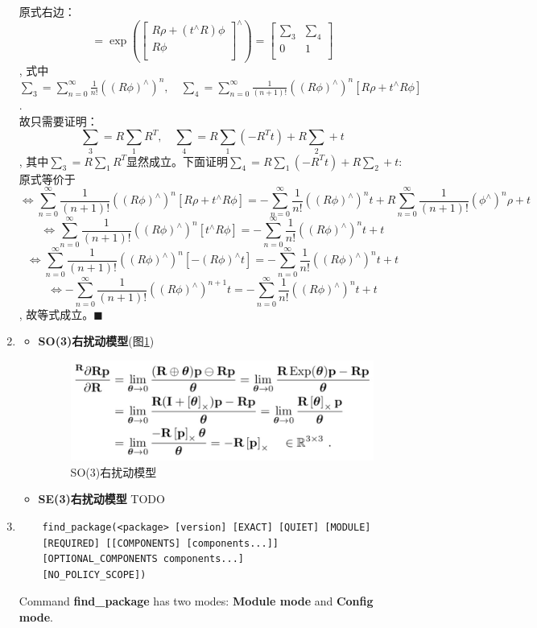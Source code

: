 \documentclass[12pt,a4paper]{ctexart}
\begin{document}
\begin{enumerate}
	原式右边：
	$$
	=\exp(
	\begin{bmatrix}
	R\rho+(t^{\wedge}R)\phi \\
	R\phi \\
	\end{bmatrix}^{\wedge})
	=
	\begin{bmatrix}
	\sum_{3} & \sum_{4} \\
	0        & 1    \\
	\end{bmatrix}
	$$, 式中$ \sum_{3}=\sum_{n=0}^{\infty}\frac{1}{n!}((R\phi)^{\wedge})^{n},\quad \sum_{4}=\sum_{n=0}^{\infty}\frac{1}{(n+1)!}((R\phi)^{\wedge})^{n}[R\rho+t^{\wedge}R\phi] $. \\
	故只需要证明：
	$$
	\sum_{3}=R\sum_{1}R^{T}, \quad \sum_{4}=R\sum_{1}(-R^{T}t)+R\sum_{2}+t
	$$, 其中$ \sum_{3}=R\sum_{1}R^{T} $显然成立。下面证明$ \sum_{4}=R\sum_{1}(-R^{T}t)+R\sum_{2}+t $:\\
	原式等价于
	$$
	\Leftrightarrow
	\sum_{n=0}^{\infty}\frac{1}{(n+1)!}((R\phi)^{\wedge})^{n}[R\rho+t^{\wedge}R\phi] = -\sum_{n=0}^{\infty}\frac{1}{n!}((R\phi)^{\wedge})^{n}t+R\sum_{n=0}^{\infty}\frac{1}{(n+1)!}(\phi^{\wedge})^{n}\rho+t
	$$
	$$
	\Leftrightarrow
	\sum_{n=0}^{\infty}\frac{1}{(n+1)!}((R\phi)^{\wedge})^{n}[t^{\wedge}R\phi] =
	-\sum_{n=0}^{\infty}\frac{1}{n!}((R\phi)^{\wedge})^{n}t+t
	$$
	$$
	\Leftrightarrow
	\sum_{n=0}^{\infty}\frac{1}{(n+1)!}((R\phi)^{\wedge})^{n}[-(R\phi)^{\wedge}t] =
	-\sum_{n=0}^{\infty}\frac{1}{n!}((R\phi)^{\wedge})^{n}t+t
	$$
	$$
	\Leftrightarrow
	-\sum_{n=0}^{\infty}\frac{1}{(n+1)!}((R\phi)^{\wedge})^{n+1}t =
	-\sum_{n=0}^{\infty}\frac{1}{n!}((R\phi)^{\wedge})^{n}t+t
	$$, 故等式成立。$ \blacksquare $
	
	\item 
		\begin{itemize}
			\item \textbf{SO(3)右扰动模型}(图\ref{fig:so3})
			\begin{figure}[tbph!]
				\centering
				\includegraphics[width=0.7\linewidth]{so3}
				\caption{SO(3)右扰动模型}
				\label{fig:so3}
			\end{figure}
			\item \textbf{SE(3)右扰动模型} TODO
		\end{itemize}
	\item 
	\begin{verbatim}
	find_package(<package> [version] [EXACT] [QUIET] [MODULE]
	[REQUIRED] [[COMPONENTS] [components...]]
	[OPTIONAL_COMPONENTS components...]
	[NO_POLICY_SCOPE])
	\end{verbatim}
	
	Command \textbf{find\_package} has two modes: \textbf{Module mode} and \textbf{Config mode}.
\end{enumerate}
\end{document}
